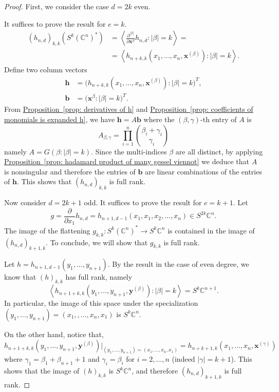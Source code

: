 \documentclass[11pt]{article}
\numberwithin{equation}{section}
\theoremstyle{definition}
\theoremstyle{plain}
\newcommand{\expref}[2]{\hyperref[#2]{#1~\ref{#2}}}
\newcommand{\vvirg}{ , \dots , }
\providecommand{\textprod}{}
\renewcommand{\textprod}{{\textstyle \prod}}
\newcommand{\bfb}{\mathbf{b}}
\newcommand{\bfh}{\mathbf{h}}
\newcommand{\bfx}{\mathbf{x}}
\newcommand{\bfy}{\mathbf{y}}
\newcommand{\bbC}{\mathbb{C}}
\begin{document}
\begin{proof}
First, we consider the case $d = 2k$ even.

It suffices to prove the result for $e = k$.
\begin{align*}
(h_{n,d})_{k,k} ( S^k (\bbC^n)^*) &= \left\langle \frac{\partial^{\vert \beta \vert}}{\partial \bfx^\beta}h_{n,d} : \vert \beta \vert =k\right\rangle = \\
  &= \left\langle h_{n+k,k}(x_1 \vvirg x_n, \bfx^{(\beta)}) : \vert \beta \vert = k \right\rangle.
\end{align*}
Define two column vectors
\begin{align*}
\bfh &= \bigl(h_{n+k,k}(x_1 \vvirg x_n, \bfx^{(\beta)}) :  \vert \beta \vert = k \bigr)^T, \\
\bfb &= \bigl(\bfx^\beta : \vert \beta \vert = k\bigr)^T.
\end{align*}
{}From \expref{Proposition}{prop: derivatives of h} and \expref{Proposition}{prop: coefficients of monomials is expanded h}, we have $\bfh = A \bfb$ where the $(\beta,\gamma)$-th entry of $A$ is 
\[
A_{\beta,\gamma} = \textprod_{i=1}^n\binom{\beta_i+\gamma_i}{\gamma_i}
\]
namely $A = G(\beta : \vert \beta \vert = k)$. Since the multi-indices $\beta$ are all distinct, by applying \expref{Proposition}{prop: hadamard product of many gessel viennot} we deduce that $A$ is nonsingular and therefore the entries of $\bfb$ are linear combinations of the entries of $\bfh$. This shows that $(h_{n,d})_{k,k}$ is full rank.

Now consider $d = 2k+1$ odd. It suffices to prove the result for $e = k+1$. Let
\[
  g = \frac{\partial}{\partial x_1}h_{n,d} = h_{n+1,d-1}(x_1,x_1,x_2 \vvirg x_n) \in S^{2k}\bbC^n.
\]
The image of the flattening $g_{k,k} : S^k (\bbC^n)^* \to S^k \bbC^n$
is contained in the image of $(h_{n,d})_{k+1,k}$.  To conclude, we
will show that $g_{k,k}$ is full rank.

Let $h = h_{n+1,d-1}(y_1 \vvirg y_{n+1})$. By the result in the case of even degree, we know that $(h)_{k,k}$ has full rank, namely 
\[
\left\langle h_{n+1+k,k}(y_1 \vvirg y_{n+1}, \bfy^{(\beta)}) : \vert \beta \vert = k\right\rangle = S^k \bbC^{n+1}.
\]
In particular, the image of this space under the specialization $(y_1 \vvirg y_{n+1}) = (x_1,\vvirg x_n,x_1)$ is $S^k \bbC^n$.

On the other hand, notice that,
\[
 h_{n+1+k,k}(y_1 \vvirg y_{n+1}, \bfy^{(\beta)})\vert_{(y_1 \vvirg y_{n+1}) = (x_1 \vvirg x_n,x_1)} = h_{n+k+1,k}(x_1 \vvirg x_n, \bfx^{(\gamma)})
\]
where $\gamma_1 = \beta_1 + \beta_{n+1} + 1$ and $\gamma_i = \beta_i$ for $i = 2 \vvirg n$ (indeed $\vert \gamma \vert = k+1$). This shows that the image of $(h)_{k,k}$ is $S^k \bbC^n$, and therefore $(h_{n,d})_{k+1,k}$ is full rank.
\end{proof}
 
\end{document}
